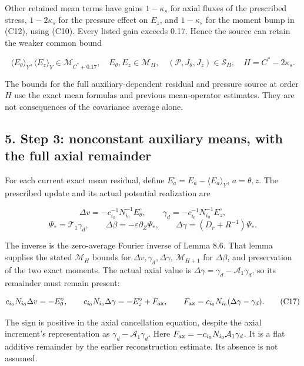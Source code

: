 \documentclass[10pt,a4paper]{article}
\begin{document}
Other retained mean terms have gains \(1-\kappa_s\) for axial fluxes of the prescribed stress, \(1-2\kappa_s\) for the pressure effect on \(E_z\), and \(1-\kappa_s\) for the moment bump in (C12), using (C10). Every listed gain exceeds 0.17. Hence the source can retain the weaker common bound

\[
\langle E_\theta\rangle_Y,\langle E_z\rangle_Y\in\mathcal M_{C^*+0.17},
\quad E_\theta,E_z\in\mathcal M_H,
\quad(\mathcal P,J_\theta,J_z)\in\mathcal S_H,
\quad H=C^*-2\kappa_s.
\tag{C15}
\]

The bounds for the full auxiliary-dependent residual and pressure source at order \(H\) use the exact mean formulas and previous mean-operator estimates. They are not consequences of the covariance average alone.

\subsection{5. Step 3: nonconstant auxiliary means, with the full axial remainder}\label{nsupstream:stage_cycle_gain_audit:step-3-nonconstant-auxiliary-means-with-the-full-axial-remainder}

For each current exact mean residual, define \(E_a^\circ=E_a-\langle E_a\rangle_Y\), \(a=\theta,z\). The prescribed update and its actual potential realization are

\[
\Delta v=-c_{i_0}^{-1}N_{i_0}^{-1}E_\theta^\circ,
\qquad\gamma_d=-c_{i_0}^{-1}N_{i_0}^{-1}E_z^\circ,
\] \[
\Psi_* =\mathcal T_1\gamma_d,\qquad
\Delta\beta=-\varepsilon\partial_Z\Psi_*,\qquad
\Delta\gamma=(D_r+R^{-1})\Psi_*.
\tag{C16}
\]

The inverse is the zero-average Fourier inverse of Lemma 8.6. That lemma supplies the stated \(\mathcal M_H\) bounds for \(\Delta v,\gamma_d,\Delta\gamma\), \(\mathcal M_{H+1}\) for \(\Delta\beta\), and preservation of the two exact moments. The actual axial value is \(\Delta\gamma=\gamma_d-\mathcal A_1\gamma_d\), so its remainder must remain present:

\[
c_{i_0}N_{i_0}\Delta v=-E_\theta^\circ,
\qquad c_{i_0}N_{i_0}\Delta\gamma=-E_z^\circ+F_{\rm ax},
\qquad F_{\rm ax}=c_{i_0}N_{i_0}(\Delta\gamma-\gamma_d).
\tag{C17}
\]

The sign is positive in the axial cancellation equation, despite the axial increment's representation as \(\gamma_d-\mathcal A_1\gamma_d\). Here \(F_{\rm ax}=-c_{i_0}N_{i_0}\mathcal A_1\gamma_d\). It is a flat additive remainder by the earlier reconstruction estimate. Its absence is not assumed.
\end{document}
